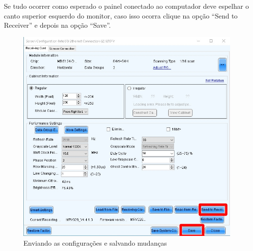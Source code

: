 \documentclass[12pt, a4paper]{article}
\begin{document}
\newpage
Se tudo ocorrer como esperado o painel conectado ao computador deve espelhar o canto superior esquerdo do monitor, caso isso ocorra clique na opção ``Send to Receiver'' e depois na opção ``Save''.
\begin{figure}[!htb]
	\centering
	\includegraphics[width=\textwidth]{Save.jpeg}
	\caption{\label{fig:Save.jpeg}Enviando as configurações e salvando mudanças}
\end{figure}

\clearpage
\end{document}

